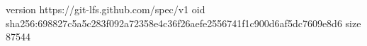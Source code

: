 version https://git-lfs.github.com/spec/v1
oid sha256:698827c5a5c283f092a72358e4c36f26aefe2556741f1c900d6af5dc7609e8d6
size 87544
